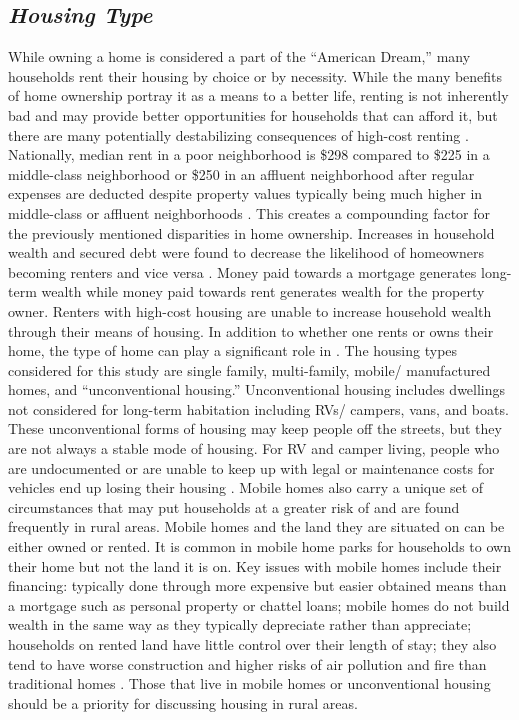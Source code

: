 \subsection{\textit{Housing Type}} 
While owning a home is considered a part of the “American Dream,” many households rent their housing by choice or by necessity. While the many benefits of home ownership portray it as a means to a better life, renting is not inherently bad and may provide better opportunities for households that can afford it, but there are many potentially destabilizing consequences of high-cost renting \citep{drew_believing_2014}. Nationally, median rent in a poor neighborhood is \$298 compared to \$225 in a middle-class neighborhood or \$250 in an affluent neighborhood after regular expenses are deducted despite property values typically being much higher in middle-class or affluent neighborhoods \citep{desmond_poor_2019}. This creates a compounding factor for the previously mentioned disparities in home ownership. Increases in household wealth and secured debt were found to decrease the likelihood of homeowners becoming renters and vice versa \citep{anderson_effect_2021}. Money paid towards a mortgage generates long-term wealth while money paid towards rent generates wealth for the property owner. Renters with high-cost housing are unable to increase household wealth through their means of housing.  In addition to whether one rents or owns their home, the type of home can play a significant role in \hs. The housing types considered for this study are single family, multi-family, mobile/ manufactured homes, and “unconventional housing.” Unconventional housing includes dwellings not considered for long-term habitation including RVs/ campers, vans, and boats. These unconventional forms of housing may keep people off the streets, but they are not always a stable mode of housing. For RV and camper living, people who are undocumented or are unable to keep up with legal or maintenance costs for vehicles end up losing their housing \citep{wakin_not_2005}. Mobile homes also carry a unique set of circumstances that may put households at a greater risk of \hs and are found frequently in rural areas. Mobile homes and the land they are situated on can be either owned or rented. It is common in mobile home parks for households to own their home but not the land it is on. Key issues with mobile homes include their financing: typically done through more expensive but easier obtained means than a mortgage such as personal property or chattel loans; mobile homes do not build wealth in the same way as they typically depreciate rather than appreciate; households on rented land have little control over their length of stay; they also tend to have worse construction and higher risks of air pollution and fire than traditional homes \citep{mactavish_wrong_2007}. Those that live in mobile homes or unconventional housing should be a priority for discussing housing in rural areas. 


